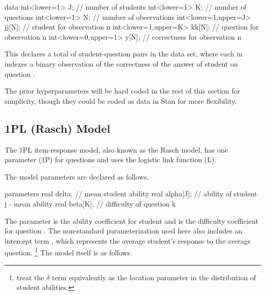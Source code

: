 \begin{stancode}
data {
  int<lower=1> J;              // number of students
  int<lower=1> K;              // number of questions
  int<lower=1> N;              // number of observations
  int<lower=1,upper=J> jj[N];  // student for observation n
  int<lower=1,upper=K> kk[N];  // question for observation n
  int<lower=0,upper=1> y[N];   // correctness for observation n
}
\end{stancode}
%
This declares a total of  student-question pairs in the data
set, where each  in  indexes a binary observation
 of the correctness of the answer of student 
on question .

The prior hyperparameters will be hard coded in the rest of this
section for simplicity, though they could be coded as data in
Stan for more flexibility.

\subsection{1PL (Rasch) Model}

The 1PL item-response model, also known as the Rasch model, has one
parameter (1P) for questions and uses the logistic link function (L).%
%


The model parameters are declared as follows.
%

\begin{stancode}
parameters {
  real delta;         // mean student ability
  real alpha[J];      // ability of student j - mean ability
  real beta[K];       // difficulty of question k
}
\end{stancode}
%
The parameter  is the ability coefficient for student
 and  is the difficulty coefficient for question
.  The non-standard parameterization used here also includes
an intercept term , which represents the average student's
response to the average question.%
%
\footnote{\citep{GelmanHill:2007} treat the $\delta$ term equivalently
  as the location parameter in the distribution of student abilities.}
%
The model itself is as follows.
%


